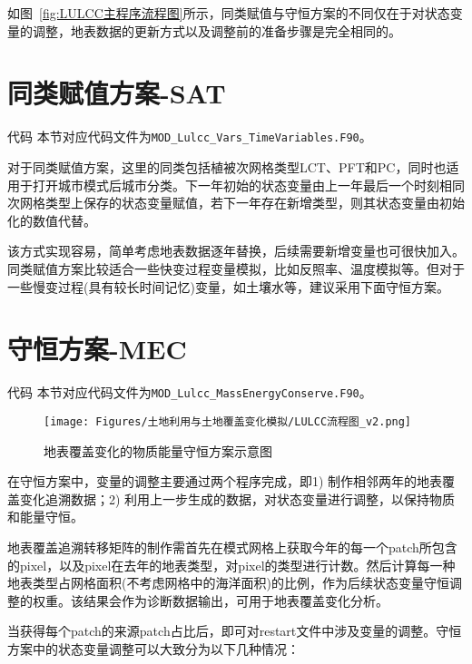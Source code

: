 如图~\ref{fig:LULCC主程序流程图}所示，同类赋值与守恒方案的不同仅在于对状态变量的调整，地表数据的更新方式以及调整前的准备步骤是完全相同的。

\section{同类赋值方案-SAT}
\begin{mymdframed}{代码}
  本节对应代码文件为\texttt{MOD\_Lulcc\_Vars\_TimeVariables.F90}。
\end{mymdframed}

对于同类赋值方案，这里的同类包括植被次网格类型LCT、PFT和PC，同时也适用于打开城市模式后城市分类。下一年初始的状态变量由上一年最后一个时刻相同次网格类型上保存的状态变量赋值，若下一年存在新增类型，则其状态变量由初始化的数值代替。

该方式实现容易，简单考虑地表数据逐年替换，后续需要新增变量也可很快加入。同类赋值方案比较适合一些快变过程变量模拟，比如反照率、温度模拟等。但对于一些慢变过程(具有较长时间记忆)变量，如土壤水等，建议采用下面守恒方案。

\section{守恒方案-MEC}
\begin{mymdframed}{代码}
  本节对应代码文件为\texttt{MOD\_Lulcc\_MassEnergyConserve.F90}。
\end{mymdframed}

{
  \begin{figure}[htbp]
    \centering
    \texttt{[image: Figures/土地利用与土地覆盖变化模拟/LULCC流程图\_v2.png]}
    \caption{地表覆盖变化的物质能量守恒方案示意图}
    \label{fig:LULCC流程图}
  \end{figure}
}

在守恒方案中，变量的调整主要通过两个程序完成，即1) 制作相邻两年的地表覆盖变化追溯数据；2) 利用上一步生成的数据，对状态变量进行调整，以保持物质和能量守恒。

地表覆盖追溯转移矩阵的制作需首先在模式网格上获取今年的每一个patch所包含的pixel，以及pixel在去年的地表类型，对pixel的类型进行计数。然后计算每一种地表类型占网格面积(不考虑网格中的海洋面积)的比例，作为后续状态变量守恒调整的权重。该结果会作为诊断数据输出，可用于地表覆盖变化分析。

当获得每个patch的来源patch占比后，即可对restart文件中涉及变量的调整。守恒方案中的状态变量调整可以大致分为以下几种情况：


